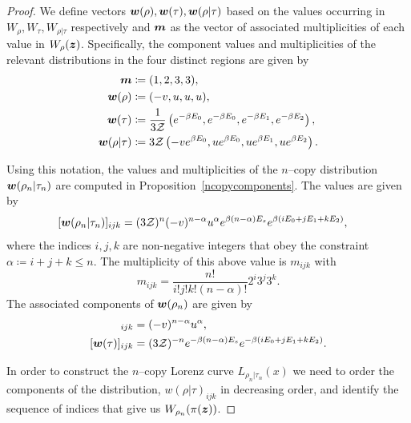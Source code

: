 \documentclass[pra,
aps,
twocolumn,
superscriptaddress,
groupedaddress,
nofootinbib,
reprint
]{revtex4-1}
\begin{document}
\begin{proof}
We define vectors $\boldsymbol{w}(\rho), \boldsymbol{w}(\tau), \boldsymbol{w}(\rho|\tau)$ based on the values occurring in $W_\rho, W_\tau, W_{\rho|\tau}$ respectively and $\bm{m}$ as the vector of associated multiplicities of each value in $W_\rho(\bm{z})$. Specifically, the component values and multiplicities of the relevant distributions in the four distinct regions are given by
\begin{align}
		\bm{m} &\coloneqq (1,2,3,3), \\
	\boldsymbol{w}(\rho) &\coloneqq (-v, u, u, u), \\
	\boldsymbol{w}(\tau) &\coloneqq \frac{1}{3\mathcal{Z}} \left( e^{-\beta E_0}, e^{-\beta E_0}, e^{-\beta E_1}, e^{-\beta E_2} \right), \\
	\boldsymbol{w}(\rho | \tau) &\coloneqq 3\mathcal{Z} \left( -v e^{\beta E_0}, u e^{\beta E_0}, u e^{\beta E_1}, u e^{\beta E_2} \right). \label{eq:bmw_rescaled}
\end{align}

Using this notation, the values and multiplicities of the $n$--copy distribution $\bm{w}(\rho_n |\tau_n)$ are computed in Proposition~\ref{ncopycomponents}. The values are given by 
\begin{align}\label{eq:ncopy_w_rescaled}
	[\boldsymbol{w}(\rho_n | \tau_n)]_{ijk} &= (3\mathcal{Z})^{n} (-v)^{n-\alpha} u^{\alpha} e^{\beta (n-\alpha)E_s} e^{\beta ( i E_0 + j E_1 + k E_2 )},
\end{align}
where the indices $i,j,k$ are non-negative integers that obey the constraint $\alpha \coloneqq i+j+k \leq n$.
The multiplicity of this above value is $m_{ijk}$ with
\begin{equation}
	m_{ijk} = \frac{n!}{i!j!k!(n-\alpha)!} 2^i 3^j 3^k.
\end{equation}
The associated components of $\boldsymbol{w}(\rho_n)$ are given by
\begin{align}
	[\w(\rho_n)]_{ijk} &= (-v)^{n-\alpha} u^{\alpha}, \label{eq:ncopy_wrho}\\
	[\w(\tau)]_{ijk} &= (3\Z)^{-n} e^{-\beta (n-\alpha)E_s} e^{-\beta ( i E_0 + j E_1 + k E_2 )}. \label{eq:ncopy_wsigma}
\end{align}

In order to construct the $n$--copy Lorenz curve $L_{\rho_n|\tau_n}(x)$ we need to order the components of the distribution, $w(\rho | \tau)_{ijk}$ in decreasing order, and identify the sequence of indices that give us $W_{\rho_n}(\pi(\bm{z}))$.


\end{proof}
\end{document}
